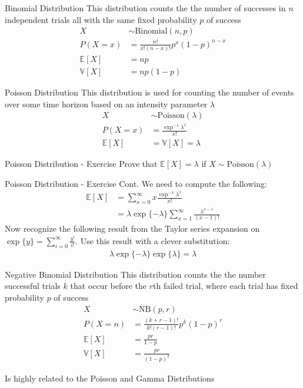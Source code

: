 \documentclass{beamer}
\begin{document}
\begin{frame}{Binomial Distribution}
This distribution counts the the number of successes in $n$ independent trials all with the same fixed probability $p$ of success
\begin{align*}
X &\sim \mathrm{Binomial}(n, p) \\
P(X  = x) &= \frac{n!}{x!(n-x)!} p^{x}(1-p)^{n-x} \\
\mathbb{E}[X] &= np \\
\mathbb{V}[X] &= n p (1-p)
\end{align*}
\end{frame}

\begin{frame}{Poisson Distribution}
This distribution is used for counting the number of events over some time horizon based on an intensity parameter $\lambda$
\begin{align*}
X &\sim \mathrm{Poisson}(\lambda)\\
P(X = x) &= \frac{\exp^{-\lambda}\lambda^{x}}{x!}\\
\mathbb{E}[X] &= \mathbb{V}[X] = \lambda
\end{align*}
\end{frame}

\begin{frame}{Poisson Distribution - Exercise}
Prove that $\mathbb{E}[X] = \lambda$ if $X\sim\mathrm{Poisson}(\lambda)$
\end{frame}

\begin{frame}{Poisson Distribution - Exercise Cont.}
We need to compute the following:
\begin{align*}
\mathbb{E}[X] &= \sum_{x = 0}^{\infty}x \frac{\exp^{-\lambda}\lambda^{x}}{x!} \\
&= \lambda \exp\{-\lambda\} \sum_{x = 1}^{\infty}\frac{\lambda^{x-1}}{(x-1)!} 
\end{align*}
Now recognize the following result from the Taylor series expansion on $\exp\{y\} = \sum_{i=0}^{\infty}\frac{y^{i}}{i!}$. Use this result with a clever substitution:
\begin{align*}
\lambda \exp\{-\lambda\} \exp\{\lambda\} = \lambda
\end{align*}
\end{frame}

\begin{frame}{Negative Binomial Distribution}
This distribution counts the the number successful trials $k$ that occur before the $r$th failed trial, where each trial has fixed probability $p$ of success
\begin{align*}
X &\sim \mathrm{NB}(p, r) \\
P(X  = n) &= \frac{(k+r - 1)!}{k!(r-1)!} p^{k}(1-p)^{r} \\
\mathbb{E}[X] &= \frac{pr}{1-p} \\
\mathbb{V}[X] &= \frac{p r}{(1-p)^2}
\end{align*}

Is highly related to the Poisson and Gamma Distributions
\end{frame}
\end{document}
